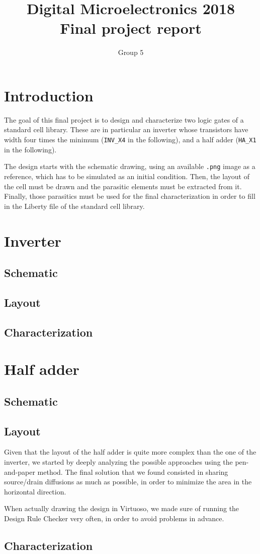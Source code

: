 \documentclass[a4paper]{article}
\title{Digital Microelectronics 2018 \\ Final project report}
\author{Group 5}
\newcommand{\inv}{\texttt{INV\_X4}\xspace}
\newcommand{\ha}{\texttt{HA\_X1}\xspace}
\begin{document}
\maketitle

\section{Introduction}
The goal of this final project is to design and characterize two logic gates of a standard cell library. These are in particular an inverter whose transistors have width four times the minimum (\inv in the following), and a half adder (\ha in the following).

The design starts with the schematic drawing, using an available \texttt{.png} image as a reference, which has to be simulated as an initial condition. Then, the layout of the cell must be drawn and the parasitic elements must be extracted from it. Finally, those parasitics must be used for the final characterization in order to fill in the Liberty file of the standard cell library.

\section{Inverter}
\subsection{Schematic}
\subsection{Layout}
\subsection{Characterization}

\section{Half adder}
\subsection{Schematic}

\subsection{Layout}
Given that the layout of the half adder is quite more complex than the one of the inverter, we started by deeply analyzing the possible approaches using the pen-and-paper method. The final solution that we found consisted in sharing source/drain diffusions as much as possible, in order to minimize the area in the horizontal direction.

When actually drawing the design in Virtuoso, we made sure of running the Design Rule Checker very often, in order to avoid problems in advance. 

\subsection{Characterization}
\end{document}
